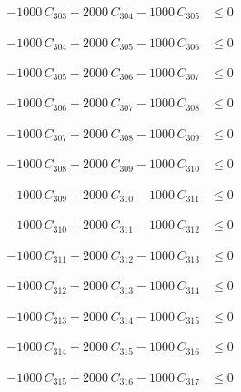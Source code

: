 \documentclass[a4paper,11pt]{article}
\begin{document}
\begin{align}
-1000\,C_{303} + 2000\,C_{304} - 1000\,C_{305} &\leq 0 \nonumber
\end{align}

\begin{align}
-1000\,C_{304} + 2000\,C_{305} - 1000\,C_{306} &\leq 0 \nonumber
\end{align}

\begin{align}
-1000\,C_{305} + 2000\,C_{306} - 1000\,C_{307} &\leq 0 \nonumber
\end{align}

\begin{align}
-1000\,C_{306} + 2000\,C_{307} - 1000\,C_{308} &\leq 0 \nonumber
\end{align}

\begin{align}
-1000\,C_{307} + 2000\,C_{308} - 1000\,C_{309} &\leq 0 \nonumber
\end{align}

\begin{align}
-1000\,C_{308} + 2000\,C_{309} - 1000\,C_{310} &\leq 0 \nonumber
\end{align}

\begin{align}
-1000\,C_{309} + 2000\,C_{310} - 1000\,C_{311} &\leq 0 \nonumber
\end{align}

\begin{align}
-1000\,C_{310} + 2000\,C_{311} - 1000\,C_{312} &\leq 0 \nonumber
\end{align}

\begin{align}
-1000\,C_{311} + 2000\,C_{312} - 1000\,C_{313} &\leq 0 \nonumber
\end{align}

\begin{align}
-1000\,C_{312} + 2000\,C_{313} - 1000\,C_{314} &\leq 0 \nonumber
\end{align}

\begin{align}
-1000\,C_{313} + 2000\,C_{314} - 1000\,C_{315} &\leq 0 \nonumber
\end{align}

\begin{align}
-1000\,C_{314} + 2000\,C_{315} - 1000\,C_{316} &\leq 0 \nonumber
\end{align}

\begin{align}
-1000\,C_{315} + 2000\,C_{316} - 1000\,C_{317} &\leq 0 \nonumber
\end{align}
\end{document}
